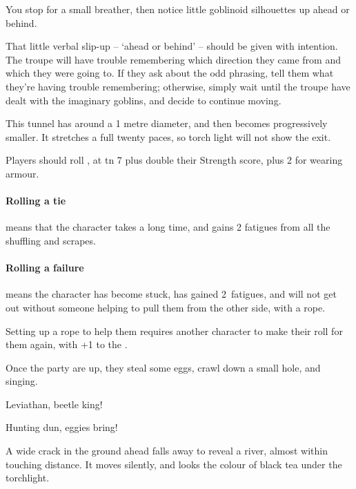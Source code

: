 \begin{multicols}{2}
\begin{boxtext}
  You stop for a small breather, then notice little goblinoid silhouettes up ahead or behind.
\end{boxtext}

That little verbal slip-up -- `ahead or behind' -- should be given with intention.
The troupe will have trouble remembering which direction they came from and which they were going to.
If they ask about the odd phrasing, tell them what they're having trouble remembering; otherwise, simply wait until the troupe have dealt with the imaginary goblins, and decide to continue moving.


This tunnel has around a 1 metre diameter, and then becomes progressively smaller.
It stretches a full twenty paces, so torch light will not show the exit.

Players should roll , at \gls{tn} 7 plus double their Strength score, plus 2 for wearing armour.

\paragraph{Rolling a tie}
means that the character takes a long time, and gains 2 \glspl{fatigue} from all the shuffling and scrapes.

\paragraph{Rolling a failure}
means the character has become stuck, has gained 2~\glspl{fatigue}, and will not get out without someone helping to pull them from the other side, with a rope.

Setting up a rope to help them requires another character to make their roll for them again, with +1 to the .


Once the party are up, they steal some eggs, crawl down a small hole, and singing.

\begin{speechtext}
  Leviathan, beetle king!

  \noindent
  Hunting dun, eggies bring!
\end{speechtext}

\begin{boxtext}
  A wide crack in the ground ahead falls away to reveal a river, almost within touching distance.
  It moves silently, and looks the colour of black tea under the torchlight.
\end{boxtext}


\end{multicols}
